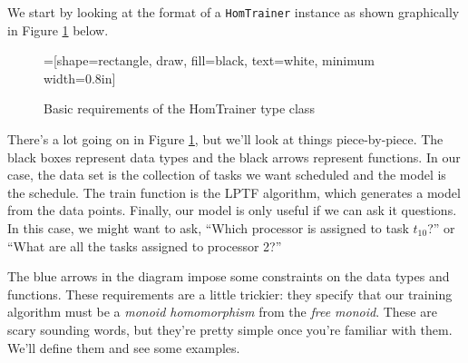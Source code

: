 \documentclass[tikz]{tmr}
\newcommand\h{\lstinline}
\newcommand\+{\mdoubleplus}
\begin{document}
We start by looking at the format of a \h{HomTrainer} instance as shown graphically in Figure \ref{fig:HomTrainer} below.

\begin{figure}[H]
\caption{Basic requirements of the HomTrainer type class}
\label{fig:HomTrainer}
\centering
{}=[shape=rectangle, draw, fill=black, text=white, minimum width=0.8in]
\vspace{0.15in}
\end{figure}

There's a lot going on in Figure \ref{fig:HomTrainer}, but we'll look at things piece-by-piece.
The black boxes represent data types and the black arrows represent functions.
In our case, the data set is the collection of tasks we want scheduled and the model is the schedule.
The train function is the LPTF algorithm, which generates a model from the data points.
Finally, our model is only useful if we can ask it questions.
In this case, we might want to ask, ``Which processor is assigned to task $t_{10}$?'' or ``What are all the tasks assigned to processor 2?''

The blue arrows in the diagram impose some constraints on the data types and functions. These requirements
are a little trickier:
they specify that our training algorithm must be a \emph{monoid homomorphism} from the \emph{free monoid}.
These are scary sounding words, but they're pretty simple once you're familiar with them.
We'll define them and see some examples.
\end{document}
